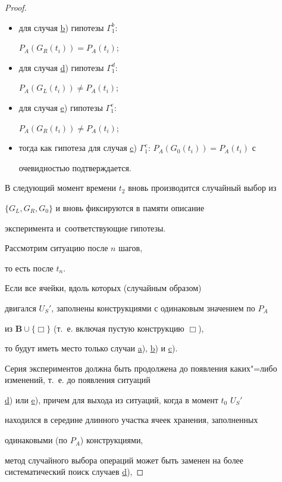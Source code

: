\begin{proof}
\begin{itemize}
\item[--] для случая  \hyperlink{kr:b1}{b}) гипотезы  $\Gamma^{b}_{1}$:

$P_{A}(G_{R}(t_{i})) = P_{A}(t_{i})$; 

\item[--] для случая  \hyperlink{kr:d1}{d}) гипотезы   $\Gamma^{d}_{1}$:

$P_{A}(G_{L}(t_{i}))\ne  P_{A}(t_{i})$; 

\item[--] для случая  \hyperlink{kr:e1}{e}) гипотезы   $\Gamma ^{e}_{1}$:

$P_{A}(G_{R}(t_{i}))\ne  P_{A}(t_{i})$; 

\item[--] тогда как гипотеза для случая \hyperlink{kr:c1}{c}) $\Gamma^{c}_{1}$: $P_{A}(G_{0}(t_{i})) = P_{A}(t_{i})$ с

очевидностью подтверждается.

\end{itemize}



В следующий момент времени $t_{2}$ вновь производится случайный выбор из

$\{G_{L},G_{R},G_{0}\}$ и вновь фиксируются в памяти описание

эксперимента и~соответствующие гипотезы. 



Рассмотрим ситуацию после $n$ шагов,

то есть после $t_{n}$. 

Если все ячейки, вдоль которых (случайным образом)

двигался $U_{S}'$, заполнены конструкциями с одинаковым значением по $P_{A}$

из $\mathbf{B}\cup \{\Box\}$ (т.~е. включая пустую конструкцию $\Box$),

то будут иметь место только случаи \hyperlink{kr:a1}{a}), \hyperlink{kr:b1}{b}) и \hyperlink{kr:c1}{c}). 

Серия экспериментов должна быть продолжена до появления каких"=либо изменений, т.~е. до появления ситуаций

\hyperlink{kr:d1}{d}) или \hyperlink{kr:e1}{e}), причем для выхода из ситуаций, когда в момент $t_{0}$ $U_{S}'$

находился в середине длинного участка ячеек хранения, заполненных

одинаковыми (по $P_{A}$) конструкциями,

метод случайного выбора операций может быть заменен на более систематический поиск случаев \hyperlink{kr:d1}{d}), 


\end{proof}
